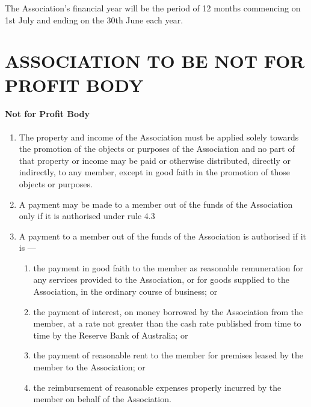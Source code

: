 \documentclass[../constitution.tex]{subfiles}
\begin{document}
The Association's financial year will be the period of 12 months commencing on 1st July and ending on the 30th June each year.

\part{ASSOCIATION TO BE NOT FOR PROFIT BODY} \label{part-2-association-to-be-not-for-profit-body}

\subsection{Not for Profit Body} \label{not-for-profit-body} 

\begin{enumerate}

\item The property and income of the Association must be applied solely towards the promotion of the objects or purposes of the Association and no part of that property or income may be paid or otherwise distributed, directly or indirectly, to any member, except in good faith in the promotion of those objects or purposes.
\item A payment may be made to a member out of the funds of the Association only if it is authorised under rule 4.3
\item A payment to a member out of the funds of the Association is authorised if it is ---

  \begin{enumerate}
  
  \item the payment in good faith to the member as reasonable remuneration for any services provided to the Association, or for goods supplied to the Association, in the ordinary course of business; or
  \item the payment of interest, on money borrowed by the Association from the member, at a rate not greater than the cash rate published from time to time by the Reserve Bank of Australia; or
  \item the payment of reasonable rent to the member for premises leased by the member to the Association; or
  \item the reimbursement of reasonable expenses properly incurred by the member on behalf of the Association.
  \end{enumerate}
\end{enumerate}
\end{document}

